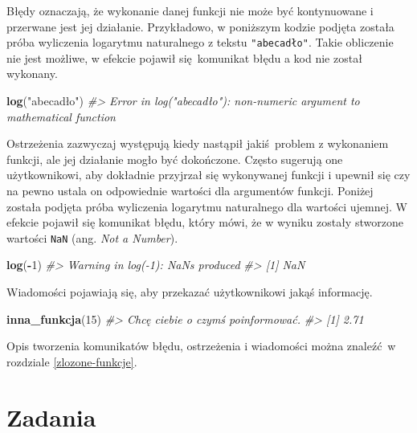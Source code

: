 \documentclass[paper=6in:9in,pagesize=pdftex,headinclude=on,footinclude=on,10pt]{scrbook}
\newenvironment{Shaded}{\begin{snugshade}}{\end{snugshade}}
\newcommand{\CommentTok}[1]{\textcolor[rgb]{0.56,0.35,0.01}{\textit{#1}}}
\newcommand{\DecValTok}[1]{\textcolor[rgb]{0.00,0.00,0.81}{#1}}
\newcommand{\KeywordTok}[1]{\textcolor[rgb]{0.13,0.29,0.53}{\textbf{#1}}}
\newcommand{\NormalTok}[1]{#1}
\newcommand{\OperatorTok}[1]{\textcolor[rgb]{0.81,0.36,0.00}{\textbf{#1}}}
\newcommand{\StringTok}[1]{\textcolor[rgb]{0.31,0.60,0.02}{#1}}
\begin{document}
Błędy oznaczają, że wykonanie danej funkcji nie może być kontynuowane i przerwane jest jej działanie.
Przykładowo, w poniższym kodzie podjęta została próba wyliczenia logarytmu naturalnego z tekstu \texttt{"abecadło"}.
Takie obliczenie nie jest możliwe, w efekcie pojawił się~komunikat błędu a kod nie został wykonany.

\begin{Shaded}
\begin{Highlighting}[]
\KeywordTok{log}\NormalTok{(}\StringTok{"abecadło"}\NormalTok{)}
\CommentTok{#> Error in log("abecadło"): non-numeric argument to mathematical function}
\end{Highlighting}
\end{Shaded}

Ostrzeżenia zazwyczaj występują kiedy nastąpił jakiś~problem z wykonaniem funkcji, ale jej działanie mogło być dokończone.
Często sugerują one użytkownikowi, aby dokładnie przyjrzał się wykonywanej funkcji i upewnił się czy na pewno ustala on odpowiednie wartości dla argumentów funkcji.
Poniżej została podjęta próba wyliczenia logarytmu naturalnego dla wartości ujemnej.
W efekcie pojawił się komunikat błędu, który mówi, że w wyniku zostały stworzone wartości \texttt{NaN} (ang. \emph{Not a Number}).

\begin{Shaded}
\begin{Highlighting}[]
\KeywordTok{log}\NormalTok{(}\OperatorTok{-}\DecValTok{1}\NormalTok{)}
\CommentTok{#> Warning in log(-1): NaNs produced}
\CommentTok{#> [1] NaN}
\end{Highlighting}
\end{Shaded}

Wiadomości pojawiają się, aby przekazać użytkownikowi jakąś informację.

\begin{Shaded}
\begin{Highlighting}[]
\KeywordTok{inna_funkcja}\NormalTok{(}\DecValTok{15}\NormalTok{)}
\CommentTok{#> Chcę ciebie o czymś poinformować.}
\CommentTok{#> [1] 2.71}
\end{Highlighting}
\end{Shaded}

Opis tworzenia komunikatów błędu, ostrzeżenia i wiadomości można znaleźć~w rozdziale \ref{zlozone-funkcje}.

\hypertarget{zadania-2}{%
\section{Zadania}\label{zadania-2}}
\end{document}
